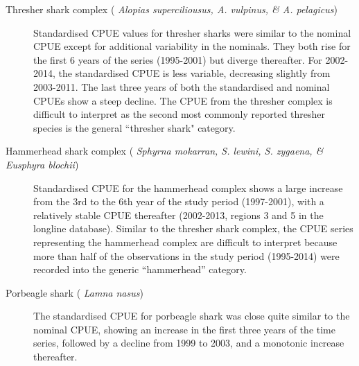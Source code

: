 \begin{description}
\item[ Thresher shark complex (\emph{ Alopias superciliousus, A. vulpinus, \& A. pelagicus})]  Standardised CPUE values for thresher sharks were similar to the nominal CPUE except for additional variability in the nominals. They both rise for the first 6 years of the series (1995-2001) but diverge thereafter. For 2002-2014, the standardised CPUE is less variable, decreasing slightly from 2003-2011. The last three years of both the standardised and nominal CPUEs show a steep decline.  The CPUE from the thresher complex is difficult to interpret as the second most commonly reported thresher species is the general ``thresher shark" category. 
 
\item[Hammerhead shark complex (\emph{ Sphyrna mokarran, S. lewini, S. zygaena, \& Eusphyra blochii})]  Standardised CPUE for the hammerhead complex shows a large increase from the 3rd to the 6th year of the study period (1997-2001), with a relatively stable CPUE thereafter (2002-2013, regions 3 and 5 in the longline database). Similar to the thresher shark complex, the CPUE series representing the hammerhead complex are difficult to interpret because more than half of the observations in the study period (1995-2014) were recorded into the generic ``hammerhead'' category.
 
 \item[Porbeagle shark (\emph{ Lamna nasus}) ] The standardised CPUE for porbeagle shark was close quite similar to the nominal CPUE, showing an increase in the first three years of the time series, followed by a decline from 1999 to 2003, and a monotonic increase thereafter.
 
 
 
\end{description}


